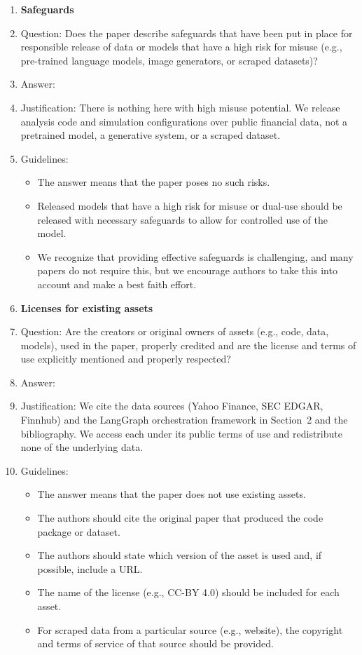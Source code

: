 \begin{enumerate}
\item {\bf Safeguards}
    \item[] Question: Does the paper describe safeguards that have been put in place for responsible release of data or models that have a high risk for misuse (e.g., pre-trained language models, image generators, or scraped datasets)?
    \item[] Answer: \answerNA{}
    \item[] Justification: There is nothing here with high misuse potential. We release analysis code and simulation configurations over public financial data, not a pretrained model, a generative system, or a scraped dataset.
    \item[] Guidelines:
    \begin{itemize}
        \item The answer \answerNA{} means that the paper poses no such risks.
        \item Released models that have a high risk for misuse or dual-use should be released with necessary safeguards to allow for controlled use of the model.
        \item We recognize that providing effective safeguards is challenging, and many papers do not require this, but we encourage authors to take this into account and make a best faith effort.
    \end{itemize}

\item {\bf Licenses for existing assets}
    \item[] Question: Are the creators or original owners of assets (e.g., code, data, models), used in the paper, properly credited and are the license and terms of use explicitly mentioned and properly respected?
    \item[] Answer: \answerYes{}
    \item[] Justification: We cite the data sources (Yahoo Finance, SEC EDGAR, Finnhub) and the LangGraph orchestration framework in Section~2 and the bibliography. We access each under its public terms of use and redistribute none of the underlying data.
    \item[] Guidelines:
    \begin{itemize}
        \item The answer \answerNA{} means that the paper does not use existing assets.
        \item The authors should cite the original paper that produced the code package or dataset.
        \item The authors should state which version of the asset is used and, if possible, include a URL.
        \item The name of the license (e.g., CC-BY 4.0) should be included for each asset.
        \item For scraped data from a particular source (e.g., website), the copyright and terms of service of that source should be provided.
    \end{itemize}


\end{enumerate}
